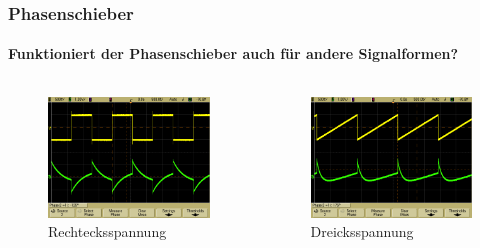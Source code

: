 \begin{frame}
\frametitle{Phasenschieber}
\framesubtitle{Funktioniert der Phasenschieber auch für andere Signalformen?}
    \begin{columns}[c]
        \begin{figure}[H]
        \begin{center}
                \includegraphics[scale=0.15]{./img/oszi/scope_10.png}
        \end{center}
        \caption{Rechtecksspannung}
        \end{figure}
        \begin{figure}[H]
        \begin{center}
                \includegraphics[scale=0.15]{./img/oszi/scope_12.png}
        \end{center}
        \caption{Dreicksspannung}
        \end{figure}
    \end{columns}
\end{frame}

